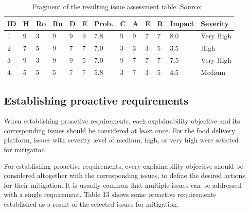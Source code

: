 \documentclass[preprint,10pt]{elsarticle}
\begin{document}
\begin{table}[h!]
    \caption{Fragment of the resulting issue assessment table. Source: .}
    \label{tab:12}
    \centering
    \begin{tabular}{@{}lllllllllllll@{}}
        \toprule
        \textbf{ID} & \textbf{H} & \textbf{Ro} & \textbf{Ru} & \textbf{D} & \textbf{E} & \textbf{Prob.} & \textbf{C} & \textbf{A} & \textbf{E} & \textbf{R} & \textbf{Impact} & \textbf{Severity} \\
        \midrule
        1 & 9 & 3 & 9 & 9 & 9 & 7.8 & 9 & 9 & 7 & 7 & 8.0 & Very High \\
        2 & 7 & 5 & 9 & 7 & 7 & 7.0 & 3 & 3 & 3 & 5 & 3.5 & High \\
        3 & 9 & 3 & 9 & 9 & 5 & 7.0 & 9 & 7 & 7 & 7 & 7.5 & Very High \\
        4 & 5 & 5 & 5 & 7 & 7 & 5.8 & 3 & 7 & 3 & 5 & 4.5 & Medium \\
        \bottomrule
    \end{tabular}
\end{table}

\subsection{Establishing proactive requirements}

When establishing proactive requirements, each explainability objective and its corresponding issues should be considered at least once. For the food delivery platform, issues with severity level of medium, high, or very high were selected for mitigation.

For establishing proactive requirements, every explainability objective should be considered altogether with the corresponding issues, to define the desired actions for their mitigation. It is usually common that multiple issues can be addressed with a single requirement. Table 13 shows some proactive requirements established as a result of the selected issues for mitigation.
\end{document}
